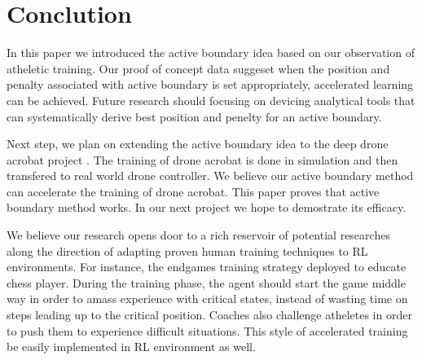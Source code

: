 \documentclass[journal]{IEEEtran}
\begin{document}
\section{Conclution}

In this paper we introduced the active boundary idea based on our observation of atheletic training. Our proof of concept data suggeset when the position and penalty associated with active boundary is set appropriately, accelerated learning can be achieved. Future research should focusing on devicing analytical tools that can systematically derive best position and penelty for an active boundary.

Next step, we plan on extending the active boundary idea to the deep drone acrobat project \cite{Kaufmann2020DeepDA}. The training of drone acrobat is done in simulation and then transfered to real world drone controller. We believe our active boundary method can accelerate the training of drone acrobat. This paper proves that active boundary method works. In our next project we hope to demostrate its efficacy. 

We believe our research opens door to a rich reservoir of potential researches along the direction of adapting proven human training techniques to RL environments. For instance, the endgames training strategy deployed to educate chess player. During the training phase, the agent should start the game middle way in order to amass experience with critical states, instead of wasting time on steps leading up to the critical position. Coaches also challenge atheletes in order to push them to experience difficult situations. This style of accelerated training be easily implemented in RL environment as well. 



\end{document}
